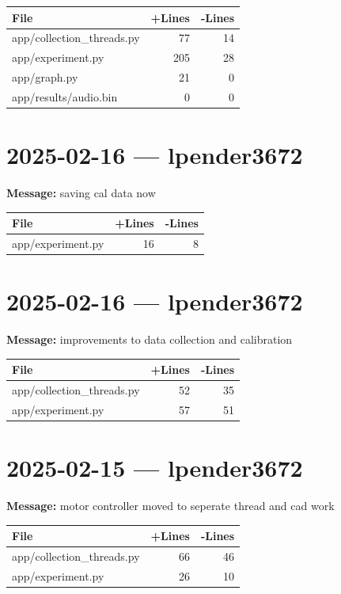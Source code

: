 \documentclass{article}
\begin{document}
\begin{longtable}{|p{10cm}|r|r|}
\hline \textbf{File} & \textbf{+Lines} & \textbf{-Lines} \\
\hline
app/collection\_threads.py & 77 & 14 \\
\hline
app/experiment.py & 205 & 28 \\
\hline
app/graph.py & 21 & 0 \\
\hline
app/results/audio.bin & 0 & 0 \\
\hline
\end{longtable}

\section*{2025-02-16 --- lpender3672}
\textbf{Message:} saving cal data now

\begin{longtable}{|p{10cm}|r|r|}
\hline \textbf{File} & \textbf{+Lines} & \textbf{-Lines} \\
\hline
app/experiment.py & 16 & 8 \\
\hline
\end{longtable}

\section*{2025-02-16 --- lpender3672}
\textbf{Message:} improvements to data collection and calibration

\begin{longtable}{|p{10cm}|r|r|}
\hline \textbf{File} & \textbf{+Lines} & \textbf{-Lines} \\
\hline
app/collection\_threads.py & 52 & 35 \\
\hline
app/experiment.py & 57 & 51 \\
\hline
\end{longtable}

\section*{2025-02-15 --- lpender3672}
\textbf{Message:} motor controller moved to seperate thread and cad work

\begin{longtable}{|p{10cm}|r|r|}
\hline \textbf{File} & \textbf{+Lines} & \textbf{-Lines} \\
\hline
app/collection\_threads.py & 66 & 46 \\
\hline
app/experiment.py & 26 & 10 \\
\hline
\end{longtable}
\end{document}

